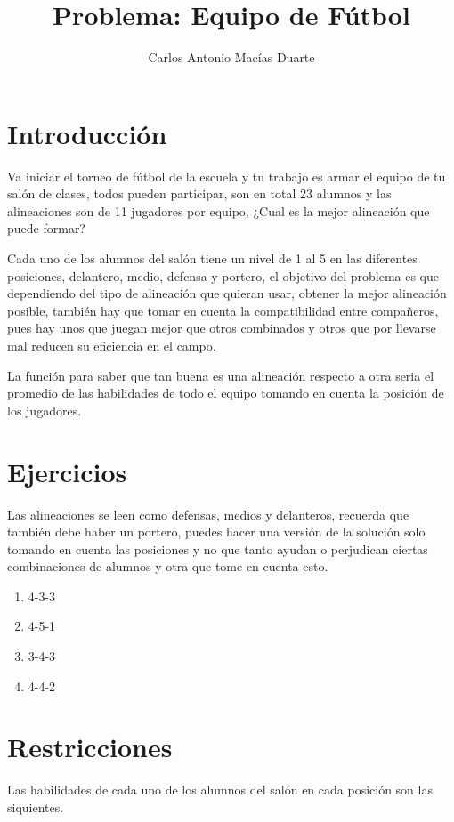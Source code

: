 \documentclass[10pt,letterpaper,twoside,openright]{article}
\author{Carlos Antonio Macías Duarte}
\title{Problema: Equipo de Fútbol}
\begin{document}
	\maketitle
		
	\section{Introducción}
	
		Va iniciar el torneo de fútbol de la escuela y tu trabajo es armar el equipo de tu salón de clases, todos pueden participar, son en total 23 alumnos y las alineaciones son de 11 jugadores por equipo, ¿Cual es la mejor alineación que puede formar?
		
		Cada uno de los alumnos del salón tiene un nivel de 1 al 5 en las diferentes posiciones, delantero, medio, defensa y portero, el objetivo del problema es que dependiendo del tipo de alineación que quieran usar, obtener la mejor alineación posible, también hay que tomar en cuenta la compatibilidad entre compañeros, pues hay unos que juegan mejor que otros combinados y otros que por llevarse mal reducen su eficiencia en el campo.
		
		La función para saber que tan buena es una alineación respecto a otra seria el promedio de las habilidades de todo el equipo tomando en cuenta la posición de los jugadores.
		
	\section{Ejercicios}
	
	Las alineaciones se leen como defensas, medios y delanteros, recuerda que también debe haber un portero, puedes hacer una versión de la solución solo tomando en cuenta las posiciones y no que tanto ayudan o perjudican ciertas combinaciones de alumnos y otra que tome en cuenta esto.
		
		\begin{enumerate}
			\item 4-3-3
			\item 4-5-1
			\item 3-4-3
			\item 4-4-2
		\end{enumerate}
		
	\section{Restricciones}
	
	Las habilidades de cada uno de los alumnos del salón en cada posición son las siquientes.
	
\end{document}
